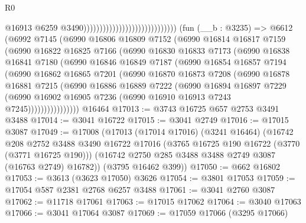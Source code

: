 \begin{lexlean}{R0}
\begin{coremodule}
                                                              @16913
                                                              @6259
                                                              @3490)))))))))))))))))))))))))))))
    (fun (__b : @3235) =>
    @6612
      (@6992
        @7145
        (@6990
          @16806
          @16809
          @7152
          (@6990
            @16814
            @16817
            @7159
            (@6990
              @16822
              @16825
              @7166
              (@6990
                @16830
                @16833
                @7173
                (@6990
                  @16838
                  @16841
                  @7180
                  (@6990
                    @16846
                    @16849
                    @7187
                    (@6990
                      @16854
                      @16857
                      @7194
                      (@6990
                        @16862
                        @16865
                        @7201
                        (@6990
                          @16870
                          @16873
                          @7208
                          (@6990
                            @16878
                            @16881
                            @7215
                            (@6990
                              @16886
                              @16889
                              @7222
                              (@6990
                                @16894
                                @16897
                                @7229
                                (@6990
                                  @16902
                                  @16905
                                  @7236
                                  (@6990 @16910 @16913 @7243 @7245))))))))))))))))
    @16464
@17013 := @3743 @16725 @657 @2753 @3491 @3488
@17014 := @3041 @16722
@17015 := @3041 @2749
@17016 := @17015 @3087
@17049 := @17008
    (@17013
      (@17014 @17016)
      (@3241 @16464)
      (@16742
        @208
        @2752
        @3488
        @3490
        @16722
        @17016
        (@3765 @16725 @190 @16722 (@3770 (@3771 @16725 @190)))
        (@16742 @2750 @285 @3488 @3488 @2749 @3087 (@16763 @2749) @16782))
      (@3795 @16462 @399))
@17050 := @662 @16802
@17053 := @3613 (@3623 @17050) @3626
@17054 := @3801 @17053
@17059 := @17054 @587 @2381 @2768 @6257 @3488
@17061 := @3041 @2760 @3087
@17062 := @11718 @17061
@17063 := @17015 @17062
@17064 := @3040 @17063
@17066 := @3041 @17064 @3087
@17069 := @17059 @17066 (@3295 @17066)

\end{coremodule}
\end{lexlean}
